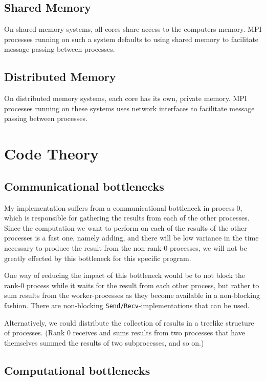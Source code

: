\documentclass[paper=a4, fontsize=11pt]{scrartcl} %
\numberwithin{equation}{section} %
\numberwithin{figure}{section} %
\numberwithin{table}{section} %
\begin{document}
\subsection{Shared Memory}

On shared memory systems, all cores share access to the computers memory.
MPI processes running on such a system defaults to using shared memory to facilitate message passing between processes.

\subsection{Distributed Memory}

On distributed memory systems, each core has its own, private memory.
MPI processes running on these systems uses network interfaces to facilitate message passing between processes.

\section{Code Theory}

\subsection{Communicational bottlenecks}

My implementation suffers from a communicational bottleneck in process 0, which is responsible for gathering the results from each of the other processes.
Since the computation we want to perform on each of the results of the other processes is a fast one, namely adding, and there will be low variance in the time necessary to produce the result from the non-rank-0 processes, we will not be greatly effected by this bottleneck for this specific program.

One way of reducing the impact of this bottleneck would be to not block the rank-0 process while it waits for the result from each other process, but rather to sum results from the worker-processes as they become available in a non-blocking fashion.
There are non-blocking \texttt{Send/Recv}-implementations that can be used.

Alternatively, we could distribute the collection of results in a treelike structure of processes. (Rank 0 receives and sums results from two processes that have themselves summed the results of two subprocesses, and so on.)


\subsection{Computational bottlenecks}
\end{document}
